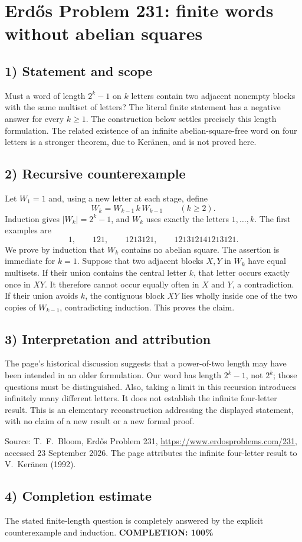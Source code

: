 \section{Erd\H{o}s Problem 231: finite words without abelian squares}

\subsection{1) Statement and scope}
Must a word of length $2^k-1$ on $k$ letters contain two adjacent
nonempty blocks with the same multiset of letters? The literal finite
statement has a negative answer for every $k\geq1$.
The construction below settles precisely this length formulation.
The related existence of an infinite abelian-square-free word on four
letters is a stronger theorem, due to Ker\"anen, and is not proved here.

\subsection{2) Recursive counterexample}
Let $W_1=1$ and, using a new letter at each stage, define
\[
 W_k=W_{k-1}\,k\,W_{k-1}\qquad(k\geq2).
\]
Induction gives $|W_k|=2^k-1$, and $W_k$ uses exactly the letters
$1,\ldots,k$. The first examples are
\[
 1,\qquad121,\qquad1213121,\qquad121312141213121.
\]
We prove by induction that $W_k$ contains no abelian square.
The assertion is immediate for $k=1$. Suppose that two adjacent
blocks $X,Y$ in $W_k$ have equal multisets. If their union contains
the central letter $k$, that letter occurs exactly once in $XY$.
It therefore cannot occur equally often in $X$ and $Y$, a contradiction.
If their union avoids $k$, the contiguous block $XY$ lies wholly
inside one of the two copies of $W_{k-1}$, contradicting induction.
This proves the claim.

\subsection{3) Interpretation and attribution}
The page's historical discussion suggests that a power-of-two length
may have been intended in an older formulation. Our word has length
$2^k-1$, not $2^k$; those questions must be distinguished.
Also, taking a limit in this recursion introduces infinitely many
different letters. It does not establish the infinite four-letter
result. This is an elementary reconstruction addressing the displayed
statement, with no claim of a new result or a new formal proof.

Source: T.~F.~Bloom, Erd\H{o}s Problem 231,
\url{https://www.erdosproblems.com/231}, accessed 23 September 2026.
The page attributes the infinite four-letter result to
V.~Ker\"anen (1992).

\subsection{4) Completion estimate}
The stated finite-length question is completely answered by the
explicit counterexample and induction.
\textbf{COMPLETION: 100\%}
